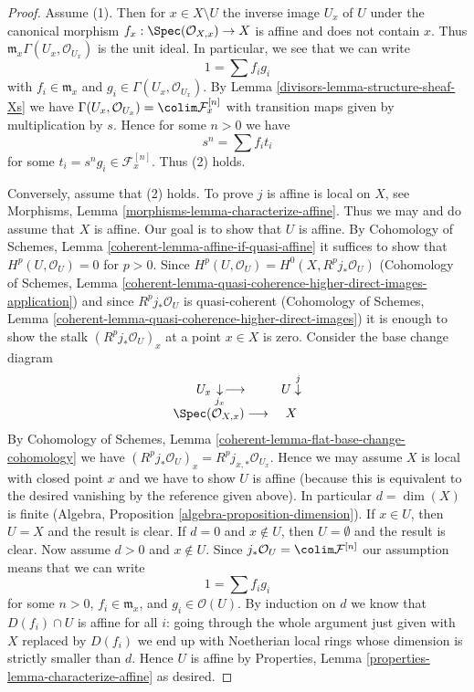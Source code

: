 \begin{proof}

Assume (1). Then for $x \in X \setminus U$ the inverse image $U_x$ of $U$
under the canonical morphism $f_x : \Spec(\mathcal{O}_{X, x}) \to X$ is affine
and does not contain $x$. Thus $\mathfrak m_x \Gamma(U_x, \mathcal{O}_{U_x})$
is the unit ideal. In particular, we see that we can write
$$
1 = \sum f_i g_i
$$
with $f_i \in \mathfrak m_x$ and $g_i \in \Gamma(U_x, \mathcal{O}_{U_x})$.
By Lemma \ref{divisors-lemma-structure-sheaf-Xs} we have
$\Gamma(U_x, \mathcal{O}_{U_x}) = \colim \mathcal{F}^{[n]}_x$
with transition maps given by multiplication by $s$.
Hence for some $n > 0$ we have
$$
s^n = \sum f_i t_i
$$
for some $t_i = s^ng_i \in \mathcal{F}^{[n]}_x$. Thus (2) holds.

\medskip\noindent
Conversely, assume that (2) holds. To prove $j$ is affine is local on $X$,
see Morphisms, Lemma \ref{morphisms-lemma-characterize-affine}.
Thus we may and do assume that $X$ is affine. Our goal is to
show that $U$ is affine.
By Cohomology of Schemes, Lemma \ref{coherent-lemma-affine-if-quasi-affine}
it suffices to show that $H^p(U, \mathcal{O}_U) = 0$ for $p > 0$.
Since $H^p(U, \mathcal{O}_U) = H^0(X, R^pj_*\mathcal{O}_U)$
(Cohomology of Schemes, Lemma
\ref{coherent-lemma-quasi-coherence-higher-direct-images-application})
and since $R^pj_*\mathcal{O}_U$ is quasi-coherent
(Cohomology of Schemes, Lemma
\ref{coherent-lemma-quasi-coherence-higher-direct-images})
it is enough to show the stalk $(R^pj_*\mathcal{O}_U)_x$
at a point $x \in X$ is zero. Consider the base change diagram
$$
\begin{array}{cc}U_x \underset{j_x}{\downarrow}\longrightarrow & U \overset{j}{\downarrow} \\ \Spec(\mathcal{O}_{X, x}) \longrightarrow & X\end{array}
$$
By Cohomology of Schemes, Lemma
\ref{coherent-lemma-flat-base-change-cohomology} we have
$(R^pj_*\mathcal{O}_U)_x = R^pj_{x, *}\mathcal{O}_{U_x}$.
Hence we may assume $X$ is local with closed point $x$
and we have to show $U$ is affine (because this is equivalent to
the desired vanishing by the reference given above).
In particular $d = \dim(X)$ is finite
(Algebra, Proposition \ref{algebra-proposition-dimension}).
If $x \in U$, then $U = X$ and the result is clear.
If $d = 0$ and $x \not \in U$, then $U = \emptyset$
and the result is clear. Now assume $d > 0$ and $x \not \in U$.
Since $j_*\mathcal{O}_U = \colim \mathcal{F}^{[n]}$
our assumption means that we can write
$$
1 = \sum f_i g_i
$$
for some $n > 0$, $f_i \in \mathfrak m_x$, and $g_i \in \mathcal{O}(U)$.
By induction on $d$ we know that $D(f_i) \cap U$ is affine
for all $i$: going through the whole argument just given with
$X$ replaced by $D(f_i)$ we end up with Noetherian local rings
whose dimension is strictly smaller than $d$. Hence $U$
is affine by Properties, Lemma \ref{properties-lemma-characterize-affine}
as desired.
\end{proof}

